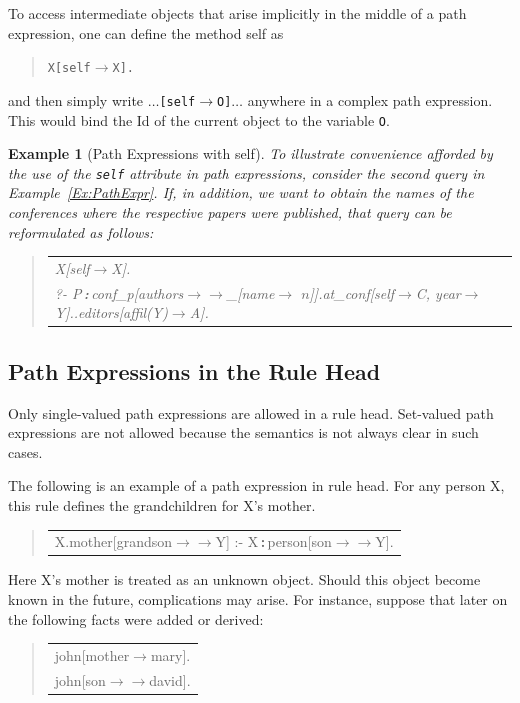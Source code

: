 \documentclass[11pt]{article}
\newtheorem{example}{Example}[section]
\newenvironment{qrules}{\begin{quote}\tt\begin{tabular}[t]{l}}%
{\end{tabular}\end{quote}}
\newcommand{\isa}{\,{\bf{:}}\,}
\newcommand{\fd}{\ensuremath{{\rightarrow}}}                   %
\newcommand{\mvd}{\ensuremath{{\rightarrow\!\!\!\!\rightarrow}}}  %
\newcommand{\anon}{\_}
\begin{document}
To access intermediate objects that arise implicitly in the middle
of a path expression, one can define the method \textsf{self} as
\begin{quote}
  {\tt X[self{\fd}X].} 
\end{quote}
and then simply write $\dots${\tt [self{\fd}O]}$\dots$ anywhere in a
complex path expression. This would bind the Id of the current object to
the variable {\tt O}.

\begin{example}[Path Expressions with \textsf{self}]\label{ex-path-self}
  \rm{
    To illustrate convenience afforded by the use of the {\tt self}
    attribute in path expressions, consider the second query in
    Example~\ref{Ex:PathExpr}. If, in addition, we want to obtain the names
    of the conferences where the respective papers were published, that
    query can be reformulated as follows:
    }
  \begin{qrules}
    X[self\fd X].\\
    ?- P\isa conf\_p[authors\mvd\anon [name\fd
    $n$]].at\_conf[self\fd C, year\fd Y]..editors[affil(Y)\fd A]. 
  \end{qrules}
\end{example}


\subsection{Path Expressions in the Rule Head}\label{sec-pathexp-head}


Only single-valued path expressions are allowed in a rule head. Set-valued
path expressions are not allowed because the semantics is not always clear
in such cases.

The following is an example of a path expression in rule head. For any
person X, this rule defines the grandchildren for X's mother.
\begin{qrules}
X.mother[grandson{\mvd}Y] :- X{\isa}person[son{\mvd}Y].
\end{qrules}
Here X's mother is treated as an unknown object. Should this object become
known in the future, complications may arise. For instance, suppose that
later on the following facts were added or derived:
\begin{qrules}
  john[mother{\fd}mary]. \\
  john[son{\mvd}david].
\end{qrules}
\end{document}
